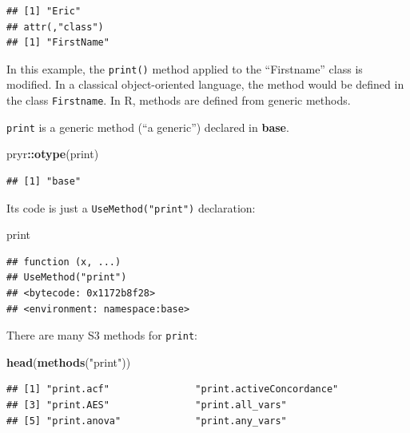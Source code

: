 \documentclass[
  12pt,
  american,
  a4paper,
  extrafontsizes,onecolumn,openright
  ]{memoir}
\newenvironment{Shaded}{\begin{snugshade}}{\end{snugshade}}
\newcommand{\FunctionTok}[1]{\textcolor[rgb]{0.13,0.29,0.53}{\textbf{#1}}}
\newcommand{\NormalTok}[1]{#1}
\newcommand{\SpecialCharTok}[1]{\textcolor[rgb]{0.81,0.36,0.00}{\textbf{#1}}}
\newcommand{\StringTok}[1]{\textcolor[rgb]{0.31,0.60,0.02}{#1}}
\begin{document}
\begin{verbatim}
## [1] "Eric"
## attr(,"class")
## [1] "FirstName"
\end{verbatim}

\normalsize

In this example, the \texttt{print()} method applied to the \enquote{Firstname} class is modified.
In a classical object-oriented language, the method would be defined in the class \texttt{Firstname}.
In R, methods are defined from generic methods.

\texttt{print} is a generic method (\enquote{a generic}) declared in \textbf{base}.

\scriptsize

\begin{Shaded}
\begin{Highlighting}[]
\NormalTok{pryr}\SpecialCharTok{::}\FunctionTok{otype}\NormalTok{(print)}
\end{Highlighting}
\end{Shaded}

\begin{verbatim}
## [1] "base"
\end{verbatim}

\normalsize

Its code is just a \texttt{UseMethod("print")} declaration:

\scriptsize

\begin{Shaded}
\begin{Highlighting}[]
\NormalTok{print}
\end{Highlighting}
\end{Shaded}

\begin{verbatim}
## function (x, ...) 
## UseMethod("print")
## <bytecode: 0x1172b8f28>
## <environment: namespace:base>
\end{verbatim}

\normalsize

There are many S3 methods for \texttt{print}:

\scriptsize

\begin{Shaded}
\begin{Highlighting}[]
\FunctionTok{head}\NormalTok{(}\FunctionTok{methods}\NormalTok{(}\StringTok{"print"}\NormalTok{))}
\end{Highlighting}
\end{Shaded}

\begin{verbatim}
## [1] "print.acf"               "print.activeConcordance"
## [3] "print.AES"               "print.all_vars"         
## [5] "print.anova"             "print.any_vars"
\end{verbatim}
\end{document}
